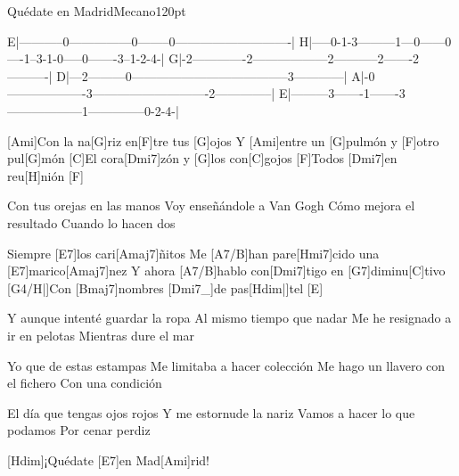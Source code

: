 \begin{song}{Quédate en Madrid}{Mecano}{120pt}

\tabs{20pt}
E|-----------0---------------0--------0----------------------------|
H|-----0-1-3---------1---0------0----1--3-1-0-----0-------3--1-2-4-|
G|-2-------------2------------------2-----------2-------2----------|
D|---2---------0--------------------------------------3------------|
A|-0-------------------3----------------------------2--------------|
E|---------3-------1-------3------------------1--------------0-2-4-|
\endtabs

%
[Ami]Con la na[G]riz en[F]tre tus [G]ojos
Y [Ami]entre un [G]pulmón y [F]otro pul[G]món
[C]El cora[Dmi7]zón y [G]los con[C]gojos
[F]Todos [Dmi7]en reu[H]nión [F]{}

%
Con tus orejas en las manos
Voy enseñándole a Van Gogh
Cómo mejora el resultado
Cuando lo hacen dos

\chorus%
[Hmi7]Siempre [E7]los cari[Amaj7]{}ñitos
Me [A7/B]han pare[Hmi7]cido una [E7]marico[Amaj7]nez
Y ahora [A7/B]hablo con[Dmi7]tigo en [G7]diminu[C]tivo
[G4/H|]{}Con [Bmaj7]nombres [Dmi7_]{de pas}[Hdim|]{tel} [E]{}

%
Y aunque intenté guardar la ropa
Al mismo tiempo que nadar
Me he resignado a ir en pelotas
Mientras dure el mar

\chorus%
Yo que de estas estampas
Me limitaba a hacer colección
Me hago un llavero con el fichero
Con una condición

%
El día que tengas ojos rojos
Y me estornude la nariz
Vamos a hacer lo que podamos
Por cenar perdiz

[Hdim]{}¡Quédate [E7]en Mad[Ami]rid!
\end{song}

